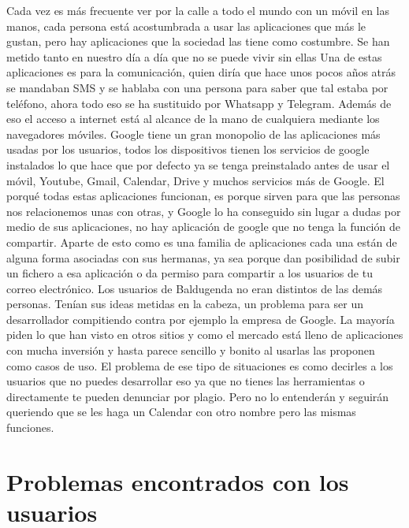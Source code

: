 Cada vez es más frecuente ver por la calle a todo el mundo con un móvil en las manos, cada persona está acostumbrada a usar las aplicaciones que más le gustan, pero hay aplicaciones que la sociedad las tiene como costumbre. Se han metido tanto en nuestro día a día que no se puede vivir sin ellas
Una de estas aplicaciones es para la comunicación, quien diría que hace unos pocos años atrás se mandaban SMS y se hablaba con una persona para saber que tal estaba por teléfono, ahora todo eso se ha sustituido por Whatsapp y Telegram.
Además de eso el acceso a internet está al alcance de la mano de cualquiera mediante los navegadores móviles.
Google tiene un gran monopolio de las aplicaciones más usadas por los usuarios, todos los dispositivos tienen los servicios de google instalados lo que hace que por defecto ya se tenga preinstalado antes de usar el móvil, Youtube, Gmail, Calendar, Drive y muchos servicios más de Google.
El porqué  todas estas aplicaciones funcionan, es porque sirven para que las personas nos relacionemos unas con otras, y Google lo ha conseguido sin lugar a dudas por medio de sus aplicaciones, no hay aplicación de google que no tenga la función de compartir.
Aparte de esto como es una familia de aplicaciones cada una están de alguna forma asociadas con sus hermanas, ya sea porque dan posibilidad de subir un fichero a esa aplicación o da permiso para compartir a los usuarios de tu correo electrónico.
Los usuarios de Baldugenda no eran distintos de las demás personas.
Tenían sus ideas metidas en la cabeza, un problema para ser un desarrollador compitiendo contra por ejemplo la empresa de Google.
La mayoría piden lo que han visto en otros sitios y como el mercado está lleno de aplicaciones con mucha inversión y hasta parece sencillo y bonito al usarlas las proponen como casos de uso. 
El problema de ese tipo de situaciones es como decirles a los usuarios que no puedes desarrollar eso ya que no tienes las herramientas o directamente te pueden denunciar por plagio.
Pero no lo entenderán y seguirán queriendo que se les haga un Calendar con otro nombre pero las mismas funciones.

\section{Problemas encontrados con los usuarios}
\label{secc:problemas encontrados con los usuarios}

